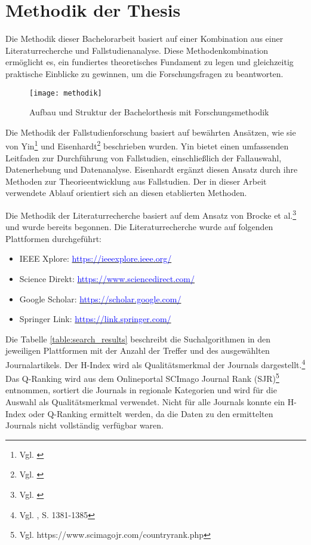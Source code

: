 
\section{Methodik der Thesis}

Die Methodik dieser Bachelorarbeit basiert auf einer Kombination aus einer Literaturrecherche und Fallstudienanalyse. Diese Methodenkombination ermöglicht es, ein fundiertes theoretisches Fundament zu legen und gleichzeitig praktische Einblicke zu gewinnen, um die Forschungsfragen zu beantworten.

\begin{figure}[H]
    \centering
    \texttt{[image: methodik]}
    \captionsetup{font=scriptsize}
    \caption{Aufbau und Struktur der Bachelorthesis mit Forschungsmethodik}
    \label{fig:methodik}
\end{figure}

Die Methodik der Fallstudienforschung basiert auf bewährten Ansätzen, wie sie von Yin\footnote{Vgl. \cite{Yin2017}} und Eisenhardt\footnote{Vgl. \cite{Eisenhardt1989}} beschrieben wurden. Yin bietet einen umfassenden Leitfaden zur Durchführung von Fallstudien, einschließlich der Fallauswahl, Datenerhebung und Datenanalyse. Eisenhardt ergänzt diesen Ansatz durch ihre Methoden zur Theorieentwicklung aus Fallstudien. Der in dieser Arbeit verwendete Ablauf orientiert sich an diesen etablierten Methoden.

Die Methodik der Literaturrecherche basiert auf dem Ansatz von Brocke et al.\footnote{Vgl. \cite{Brocke2015}} und wurde bereits begonnen. Die Literaturrecherche wurde auf folgenden Plattformen durchgeführt:

\begin{itemize}
    \item IEEE Xplore: \underline{\textcolor{blue}{https://ieeexplore.ieee.org/}}
    \item Science Direkt: \underline{\textcolor{blue}{https://www.sciencedirect.com/}}
    \item Google Scholar: \underline{\textcolor{blue}{https://scholar.google.com/}}
    \item Springer Link: \underline{\textcolor{blue}{https://link.springer.com/}}
\end{itemize}

Die Tabelle \ref{table:search_results} beschreibt die Suchalgorithmen in den jeweiligen Plattformen mit der Anzahl der Treffer und des ausgewählten Journalartikels. Der H-Index wird als Qualitätsmerkmal der Journals dargestellt.\footnote{Vgl. \cite{Bornmann2007}, S. 1381-1385} Das Q-Ranking wird aus dem Onlineportal SCImago Journal Rank (SJR)\footnote{Vgl. https://www.scimagojr.com/countryrank.php } entnommen, sortiert die Journals in regionale Kategorien und wird für die Auswahl als Qualitätsmerkmal verwendet. Nicht für alle Journals konnte ein H-Index oder Q-Ranking ermittelt werden, da die Daten zu den ermittelten Journals nicht vollständig verfügbar waren.

